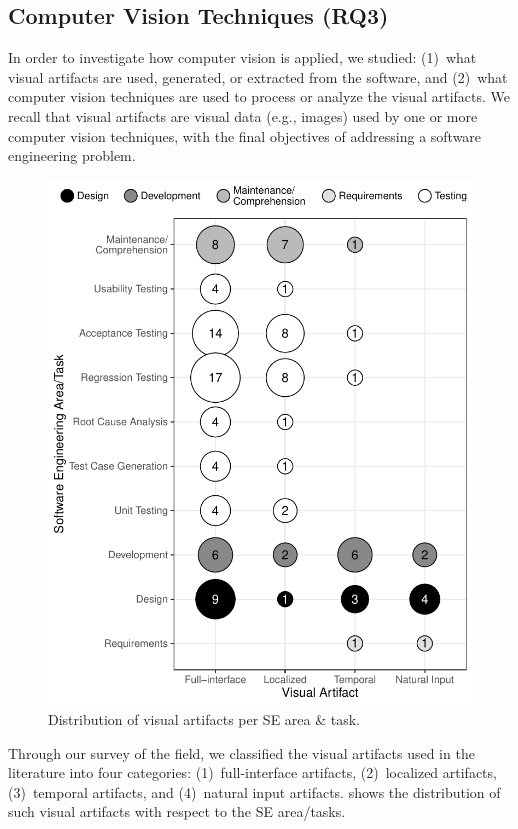 \subsection{Computer Vision Techniques (RQ3)}


In order to investigate how computer vision is applied, we studied:
(1)~what visual artifacts are used, generated, or extracted from the software,
and (2)~what computer vision techniques are used to process or analyze the visual artifacts.
We recall that visual artifacts are visual data (e.g.,  images) used by one or more computer vision
techniques, with the final objectives of addressing a software engineering problem.


\begin{figure}
    \centering
    \includegraphics[width=0.8\linewidth]{survey/figures/visual-artifacts-bubble-plot}
    \caption{Distribution of visual artifacts per SE area \& task.}\label{fig-artifacts}
\end{figure}



Through our survey of the field, we classified the 
visual artifacts used in the literature into four categories:
(1)~full-interface artifacts, (2)~localized artifacts,
(3)~temporal artifacts, and (4)~natural input artifacts. 
 shows the distribution of such visual artifacts 
with respect to the SE area/tasks.

